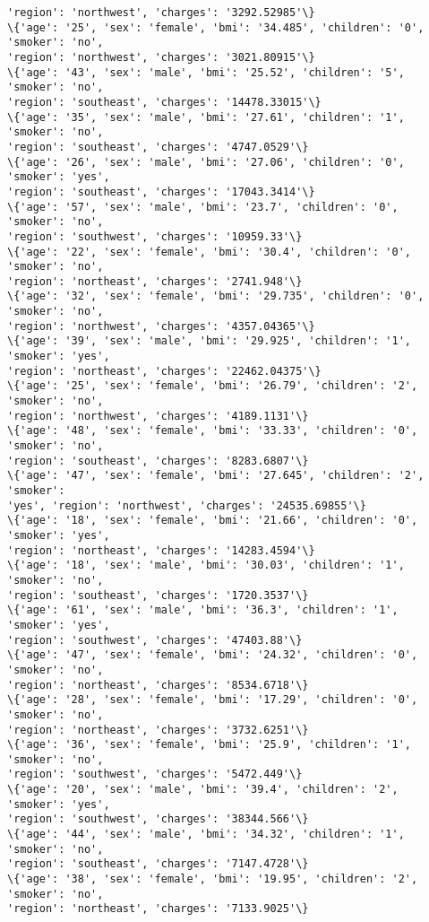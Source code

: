 \documentclass[11pt]{article}
\begin{document}
\begin{Verbatim}[commandchars=\\\{\}]
'region': 'northwest', 'charges': '3292.52985'\}
\{'age': '25', 'sex': 'female', 'bmi': '34.485', 'children': '0', 'smoker': 'no',
'region': 'northwest', 'charges': '3021.80915'\}
\{'age': '43', 'sex': 'male', 'bmi': '25.52', 'children': '5', 'smoker': 'no',
'region': 'southeast', 'charges': '14478.33015'\}
\{'age': '35', 'sex': 'male', 'bmi': '27.61', 'children': '1', 'smoker': 'no',
'region': 'southeast', 'charges': '4747.0529'\}
\{'age': '26', 'sex': 'male', 'bmi': '27.06', 'children': '0', 'smoker': 'yes',
'region': 'southeast', 'charges': '17043.3414'\}
\{'age': '57', 'sex': 'male', 'bmi': '23.7', 'children': '0', 'smoker': 'no',
'region': 'southwest', 'charges': '10959.33'\}
\{'age': '22', 'sex': 'female', 'bmi': '30.4', 'children': '0', 'smoker': 'no',
'region': 'northeast', 'charges': '2741.948'\}
\{'age': '32', 'sex': 'female', 'bmi': '29.735', 'children': '0', 'smoker': 'no',
'region': 'northwest', 'charges': '4357.04365'\}
\{'age': '39', 'sex': 'male', 'bmi': '29.925', 'children': '1', 'smoker': 'yes',
'region': 'northeast', 'charges': '22462.04375'\}
\{'age': '25', 'sex': 'female', 'bmi': '26.79', 'children': '2', 'smoker': 'no',
'region': 'northwest', 'charges': '4189.1131'\}
\{'age': '48', 'sex': 'female', 'bmi': '33.33', 'children': '0', 'smoker': 'no',
'region': 'southeast', 'charges': '8283.6807'\}
\{'age': '47', 'sex': 'female', 'bmi': '27.645', 'children': '2', 'smoker':
'yes', 'region': 'northwest', 'charges': '24535.69855'\}
\{'age': '18', 'sex': 'female', 'bmi': '21.66', 'children': '0', 'smoker': 'yes',
'region': 'northeast', 'charges': '14283.4594'\}
\{'age': '18', 'sex': 'male', 'bmi': '30.03', 'children': '1', 'smoker': 'no',
'region': 'southeast', 'charges': '1720.3537'\}
\{'age': '61', 'sex': 'male', 'bmi': '36.3', 'children': '1', 'smoker': 'yes',
'region': 'southwest', 'charges': '47403.88'\}
\{'age': '47', 'sex': 'female', 'bmi': '24.32', 'children': '0', 'smoker': 'no',
'region': 'northeast', 'charges': '8534.6718'\}
\{'age': '28', 'sex': 'female', 'bmi': '17.29', 'children': '0', 'smoker': 'no',
'region': 'northeast', 'charges': '3732.6251'\}
\{'age': '36', 'sex': 'female', 'bmi': '25.9', 'children': '1', 'smoker': 'no',
'region': 'southwest', 'charges': '5472.449'\}
\{'age': '20', 'sex': 'male', 'bmi': '39.4', 'children': '2', 'smoker': 'yes',
'region': 'southwest', 'charges': '38344.566'\}
\{'age': '44', 'sex': 'male', 'bmi': '34.32', 'children': '1', 'smoker': 'no',
'region': 'southeast', 'charges': '7147.4728'\}
\{'age': '38', 'sex': 'female', 'bmi': '19.95', 'children': '2', 'smoker': 'no',
'region': 'northeast', 'charges': '7133.9025'\}

\end{Verbatim}
\end{document}
